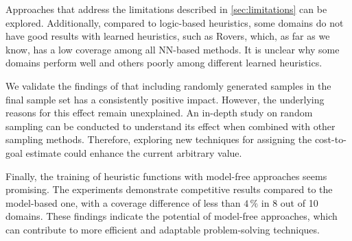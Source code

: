 Approaches that address the limitations described in \cref{sec:limitations} can be explored. Additionally, compared to logic-based heuristics, some domains do not have good results with learned heuristics, such as Rovers, which, as far as we know, has a low coverage among all NN-based methods. It is unclear why some domains perform well and others poorly among different learned heuristics.

We validate the findings of \citet{otoole2022sampling} that including randomly generated samples in the final sample set has a consistently positive impact. However, the underlying reasons for this effect remain unexplained. An in-depth study on random sampling can be conducted to understand its effect when combined with other sampling methods. Therefore, exploring new techniques for assigning the cost-to-goal estimate could enhance the current arbitrary value.

Finally, the training of heuristic functions with model-free approaches seems promising. The experiments demonstrate competitive results compared to the model-based one, with a coverage difference of less than $4\,\%$ in 8 out of 10 domains. These findings indicate the potential of model-free approaches, which can contribute to more efficient and adaptable problem-solving techniques.
